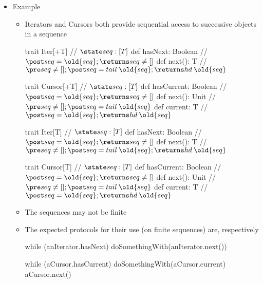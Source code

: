 \documentclass{ip3}
\begin{document}
\begin{foil}[Adapter]
\begin{itemize}
\item Example
\begin{itemize}
        \item Iterators and Cursors both provide sequential access to successive objects in a sequence

\begin{code*}

        trait Iter[+T] {          // $\state seq: [T]$
         def hasNext: Boolean    // $\post seq=\old{seq}; \returns seq\not=[]$
         def next():  T          // $\pre seq\not=[]; \post seq=tail\:\old{seq}; \returns hd\:\old{seq}$
        }

\end{code*}
\begin{code*}
        trait Cursor[+T] {        // $\state seq: [T]$
         def hasCurrent: Boolean // $\post seq=\old{seq}; \returns seq\not=[]$
         def next():     Unit    // $\pre seq\not=[]; \post seq=tail\:\old{seq}$
         def current:    T       // $\post seq=\old{seq}; \returns hd\:\old{seq}$
        } 
\end{code*} 
\begin{-scala}

        trait Iter[T] {          // $\state seq: [T]$
         def hasNext: Boolean    // $\post seq=\old{seq}; \returns seq\not=[]$
         def next():  T          // $\pre seq\not=[]; \post seq=tail\:\old{seq}; \returns hd\:\old{seq}$
        }

        trait Cursor[T] {        // $\state seq: [T]$
         def hasCurrent: Boolean // $\post seq=\old{seq}; \returns seq\not=[]$
         def next():     Unit    // $\pre seq\not=[]; \post seq=tail\:\old{seq}$
         def current:    T       // $\post seq=\old{seq}; \returns hd\:\old{seq}$
        } 
\end{-scala} 

        \item The sequences may not be finite
        \item The expected protocols for their use (on finite sequences) are, respectively
\begin{-scala}

        while (anIterator.hasNext) doSomethingWith(anIterator.next())
        
        while (aCursor.hasCurrent) { 
           doSomethingWith(aCursor.current)
           aCursor.next()
        }
\end{-scala}
\end{itemize}
\end{itemize} 
\end{foil}
\end{document}
